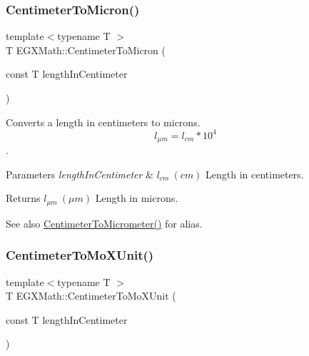 \subsubsection{\texorpdfstring{Centimeter\+To\+Micron()}{CentimeterToMicron()}}
{\footnotesize\ttfamily template$<$typename T $>$ \\
T E\+G\+X\+Math\+::\+Centimeter\+To\+Micron (\begin{DoxyParamCaption}\item[{const T}]{length\+In\+Centimeter }\end{DoxyParamCaption})}



Converts a length in centimeters to microns. \[ l_{\mu m}=l_{cm} * 10^{4} \]. 


\begin{DoxyParams}{Parameters}
{\em length\+In\+Centimeter} & $ l_{cm}\ (cm)$ Length in centimeters. \\
\hline
\end{DoxyParams}
\begin{DoxyReturn}{Returns}
$ l_{\mu m}\ (\mu m)$ Length in microns. 
\end{DoxyReturn}
\begin{DoxySeeAlso}{See also}
\mbox{\hyperlink{group___e_g_x_math-_conversions-_length_conversions-_centimeter-_s_i_gaa05fd2c1b2c9ab2ac8aa7f1ef8be612a}{Centimeter\+To\+Micrometer()}} for alias. 
\end{DoxySeeAlso}
\mbox{\label{group___e_g_x_math-_conversions-_length_conversions-_centimeter-_non-_s_i_ga4e94aa6f1cc6aaeb751384a8472b01fd}} 
\subsubsection{\texorpdfstring{Centimeter\+To\+Mo\+X\+Unit()}{CentimeterToMoXUnit()}}
{\footnotesize\ttfamily template$<$typename T $>$ \\
T E\+G\+X\+Math\+::\+Centimeter\+To\+Mo\+X\+Unit (\begin{DoxyParamCaption}\item[{const T}]{length\+In\+Centimeter }\end{DoxyParamCaption})}



